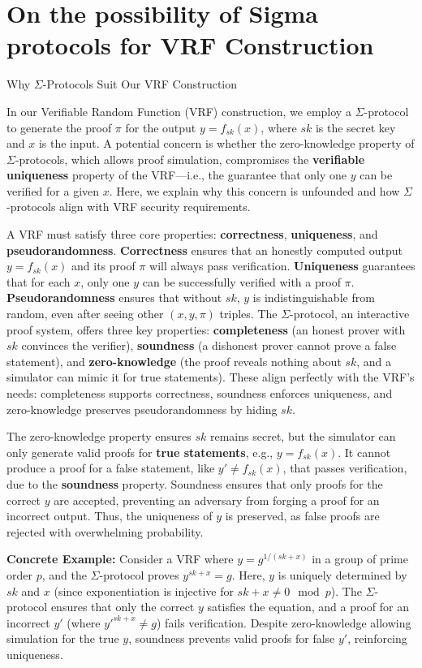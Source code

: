 \section{On the possibility of Sigma protocols for VRF Construction}
Why $\Sigma$-Protocols Suit Our VRF Construction

In our Verifiable Random Function (VRF) construction, we employ a $\Sigma$-protocol to generate the proof $\pi$ for the output $y = f_{sk}(x)$, where $sk$ is the secret key and $x$ is the input. A potential concern is whether the zero-knowledge property of $\Sigma$-protocols, which allows proof simulation, compromises the \textbf{verifiable uniqueness} property of the VRF—i.e., the guarantee that only one $y$ can be verified for a given $x$. Here, we explain why this concern is unfounded and how $\Sigma$-protocols align with VRF security requirements.

A VRF must satisfy three core properties: \textbf{correctness}, \textbf{uniqueness}, and \textbf{pseudorandomness}. \textbf{Correctness} ensures that an honestly computed output $y = f_{sk}(x)$ and its proof $\pi$ will always pass verification. \textbf{Uniqueness} guarantees that for each $x$, only one $y$ can be successfully verified with a proof $\pi$. \textbf{Pseudorandomness} ensures that without $sk$, $y$ is indistinguishable from random, even after seeing other $(x, y, \pi)$ triples. The $\Sigma$-protocol, an interactive proof system, offers three key properties: \textbf{completeness} (an honest prover with $sk$ convinces the verifier), \textbf{soundness} (a dishonest prover cannot prove a false statement), and \textbf{zero-knowledge} (the proof reveals nothing about $sk$, and a simulator can mimic it for true statements). These align perfectly with the VRF's needs: completeness supports correctness, soundness enforces uniqueness, and zero-knowledge preserves pseudorandomness by hiding $sk$.

The zero-knowledge property ensures $sk$ remains secret, but the simulator can only generate valid proofs for \textbf{true statements}, e.g., $y = f_{sk}(x)$. It cannot produce a proof for a false statement, like $y' \neq f_{sk}(x)$, that passes verification, due to the \textbf{soundness} property. Soundness ensures that only proofs for the correct $y$ are accepted, preventing an adversary from forging a proof for an incorrect output. Thus, the uniqueness of $y$ is preserved, as false proofs are rejected with overwhelming probability.

\textbf{Concrete Example:} Consider a VRF where $y = g^{1/(sk + x)}$ in a group of prime order $p$, and the $\Sigma$-protocol proves $y^{sk + x} = g$. Here, $y$ is uniquely determined by $sk$ and $x$ (since exponentiation is injective for $sk + x \neq 0 \mod p$). The $\Sigma$-protocol ensures that only the correct $y$ satisfies the equation, and a proof for an incorrect $y'$ (where $y'^{sk + x} \neq g$) fails verification. Despite zero-knowledge allowing simulation for the true $y$, soundness prevents valid proofs for false $y'$, reinforcing uniqueness.

